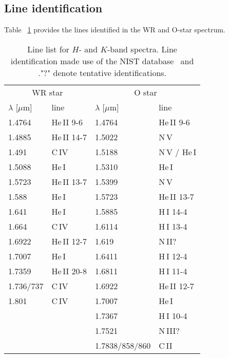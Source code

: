 \documentclass[usenatbib]{mnras}%
\begin{document}
\subsection{Line identification}
\label{sec:lineident}

Table ~\ref{tab:linelist} provides the lines identified in the WR and O-star spectrum.

\begin{table}
      \caption[]{Line list for $H$- and $K$-band spectra. Line identification made use of the NIST database~\citep{NIST_ASD} and \citet{Varricatt+2004} ."?" denote tentative identifications.}
         \label{tab:linelist}
\centering                          %
\begin{tabular}{l l | l l }        %
\hline\hline                 %
\multicolumn{2}{c|}{WR star} & \multicolumn{2}{c}{O star}\\
$\lambda$ [$\mu$m] & line &$\lambda$ [$\mu$m] & line\\    %
\hline                        %
\noalign{\smallskip}
 1.4764 & He\,II 9-6 & 1.4764  & He\,II 9-6\\
 1.4885 & He\,II 14-7& 1.5022  & N\,V\\
 1.491  & C\,IV      & 1.5188  & N\,V / He\,I\\
 1.5088 & He\,I      & 1.5310  & He\,I\\
 1.5723 & He\,II 13-7& 1.5399  & N\,V\\
 1.588  & He\,I      & 1.5723  & He\,II 13-7 \\
 1.641  & He\,I      & 1.5885  & H\,I 14-4\\
 1.664  & C\,IV      & 1.6114  & H\,I 13-4\\
 1.6922 & He\,II 12-7& 1.619   & N\,II?\\
 1.7007 & He\,I      & 1.6411  & H\,I 12-4\\
 1.7359 & He\,II 20-8& 1.6811  & H\,I 11-4 \\
 1.736/737 & C\,IV   & 1.6922  & He\,II 12-7\\
 1.801  & C\,IV      & 1.7007  & He\,I\\
        &            & 1.7367  & H\,I 10-4\\
        &            & 1.7521  & N\,III?\\
        &            & 1.7838/858/860 & C\,II\\
\hline                                   %

\end{tabular}
\end{table}
\end{document}
